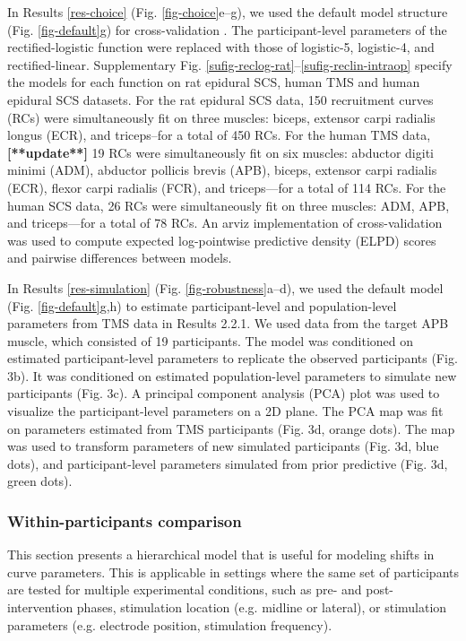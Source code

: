 \documentclass[pdflatex,sn-mathphys-ay]{sn-jnl}%
\numberwithin{equation}{subsection}
\theoremstyle{thmstyleone}%
\theoremstyle{thmstyletwo}%
\theoremstyle{thmstylethree}%
\begin{document}
\bigskip\noindent In Results \ref{res-choice} (Fig. \ref{fig-choice}e--g), we used the default model structure (Fig. \ref{fig-default}g) for cross-validation \cite{vehtari_practical_2017}. The participant-level parameters of the rectified-logistic function were replaced with those of logistic-5, logistic-4, and rectified-linear. Supplementary Fig. \ref{sufig-reclog-rat}--\ref{sufig-reclin-intraop} specify the models for each function on rat epidural SCS, human TMS and human epidural SCS datasets. For the rat epidural SCS data, 150 recruitment curves (RCs) were simultaneously fit on three muscles: biceps, extensor carpi radialis longus (ECR), and triceps--for a total of 450 RCs. For the human TMS data, \textbf{[**update**]} 19 RCs  were simultaneously fit on six muscles: abductor digiti minimi (ADM), abductor pollicis brevis (APB), biceps, extensor carpi radialis (ECR), flexor carpi radialis (FCR), and triceps—for a total of 114 RCs. For the human SCS data, 26 RCs were simultaneously fit on three muscles: ADM, APB, and triceps—for a total of 78 RCs. An arviz \cite{kumar_arviz_2019} implementation of cross-validation \cite{vehtari_practical_2017} was used to compute expected log-pointwise predictive density (ELPD) scores and pairwise differences between models.

\bigskip\noindent In Results \ref{res-simulation} (Fig. \ref{fig-robustness}a--d), we used the default model (Fig. \ref{fig-default}g,h) to estimate participant-level and population-level parameters from TMS data in Results 2.2.1. We used data from the target APB muscle, which consisted of 19 participants. The model was conditioned on estimated participant-level parameters to replicate the observed participants (Fig. 3b). It was conditioned on estimated population-level parameters to simulate new participants (Fig. 3c). A principal component analysis (PCA) plot was used to visualize the participant-level parameters on a 2D plane. The PCA map was fit on parameters estimated from TMS participants (Fig. 3d, orange dots). The map was used to transform parameters of new simulated participants (Fig. 3d, blue dots), and participant-level parameters simulated from prior predictive (Fig. 3d, green dots).

\subsubsection{Within-participants comparison}
This section presents a hierarchical model that is useful for modeling shifts in curve parameters. This is applicable in settings where the same set of participants are tested for multiple experimental conditions, such as pre- and post-intervention phases, stimulation location (e.g. midline or lateral), or stimulation parameters (e.g. electrode position, stimulation frequency).
\end{document}

